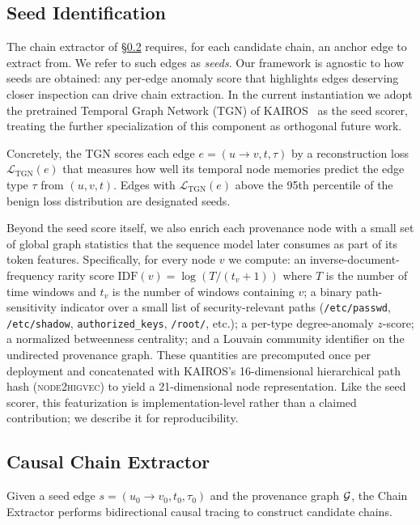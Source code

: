 \subsection{Seed Identification}
\label{sec:seed}

The chain extractor of \S\ref{sec:extractor} requires, for each candidate chain, an anchor edge to extract from. We refer to such edges as \emph{seeds}. Our framework is agnostic to how seeds are obtained: any per-edge anomaly score that highlights edges deserving closer inspection can drive chain extraction. In the current instantiation we adopt the pretrained Temporal Graph Network (TGN) of KAIROS~\cite{cheng2024kairos} as the seed scorer, treating the further specialization of this component as orthogonal future work.

Concretely, the TGN scores each edge $e = (u \rightarrow v, t, \tau)$ by a reconstruction loss $\mathcal{L}_{\text{TGN}}(e)$ that measures how well its temporal node memories predict the edge type $\tau$ from $(u, v, t)$. Edges with $\mathcal{L}_{\text{TGN}}(e)$ above the 95th percentile of the benign loss distribution are designated seeds.

Beyond the seed score itself, we also enrich each provenance node with a small set of global graph statistics that the sequence model later consumes as part of its token features. Specifically, for every node $v$ we compute: an inverse-document-frequency rarity score $\text{IDF}(v) = \log(T / (t_v + 1))$ where $T$ is the number of time windows and $t_v$ is the number of windows containing $v$; a binary path-sensitivity indicator over a small list of security-relevant paths (\texttt{/etc/passwd}, \texttt{/etc/shadow}, \texttt{authorized\_keys}, \texttt{/root/}, etc.); a per-type degree-anomaly $z$-score; a normalized betweenness centrality; and a Louvain community identifier on the undirected provenance graph. These quantities are precomputed once per deployment and concatenated with KAIROS's 16-dimensional hierarchical path hash (\textsc{node2higvec}) to yield a 21-dimensional node representation. Like the seed scorer, this featurization is implementation-level rather than a claimed contribution; we describe it for reproducibility.

\subsection{Causal Chain Extractor}
\label{sec:extractor}

Given a seed edge $s = (u_0 \rightarrow v_0, t_0, \tau_0)$ and the provenance graph $\mathcal{G}$, the Chain Extractor performs bidirectional causal tracing to construct candidate chains.


